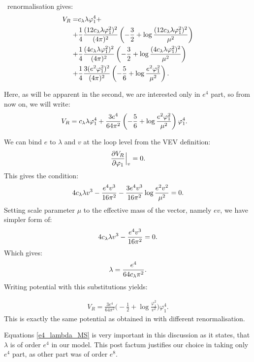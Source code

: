 \MSbar\ renormalisation gives:
\begin{align}
V_{R}=&c_\lambda\lambda\varphi_1^4 + \notag \\
+&\frac{1}{4}\frac{(12c_\lambda\lambda\varphi_1^2)^2}{(4\pi)^2}\left(-\frac{3}{2}+ 
\log{\frac{(12c_\lambda\lambda\varphi_1^2)^2}{\mu^2}}\right)\notag  \\
+&\frac{1}{4}\frac{(4c_\lambda\lambda\varphi_1^2)^2}{(4\pi)^2}\left(-\frac{3}{2}+ 
\log{\frac{(4c_\lambda\lambda\varphi_1^2)^2}{\mu^2}}\right) \notag \\
+&\frac{1}{4}\frac{3(e^2\varphi_1^2)^2}{(4\pi)^2}\left(-\frac{5}{6}+
\log{\frac{e^2\varphi_1^2}{\mu^2}}\right).
\end{align}

Here, as will be apparent in the second, we are interested only in $e^4$ part, so from now on, 
we will write:
\begin{align}
V_{R}=c_\lambda\lambda\varphi_1^4 + \frac{3e^4}{64\pi^2}&\left(-\frac{5}{6}+
\log{\frac{e^2\varphi_1^2}{\mu^2}}\right)\varphi_1^4.
\end{align}

We can bind $e$ to $\lambda$ and $v$ at the loop level from the VEV definition:
\begin{align}
\frac{\partial V_R}{\partial \varphi_1} \Big|_v= 0.
\end{align}
This gives the condition:
\begin{align}
4c_\lambda\lambda v^3-\frac{e^4v^3}{16\pi^2}-\frac{3e^4v^3}{16\pi^2}\log\frac{e^2v^2}{\mu^2}=0.
\end{align}
Setting scale parameter $\mu$ to the effective mass of the vector, namely $ev$, we have 
simpler form of:
\begin{align}
4c_\lambda\lambda v^3-\frac{e^4v^3}{16\pi^2}=0.
\end{align}
Which gives:
\begin{align}\label{e4_lambda_MS}
\lambda = \frac{e^4}{64c_\lambda\pi^2}.
\end{align}
Writing potential with this substitutions yields:

\begin{align}\label{MSbar_result}
V_R = \frac{3e^4}{64\pi^2}\Big(-\frac{1}{2}+\log\frac{\varphi_1^2}{v^2}\Big)\varphi_1^4.
\end{align}
This is exactly the same potential as obtained in \cite{Coleman1973} with different renormalisation.

Equations \ref{e4_lambda_MS} is very important in this discussion as it states, that $\lambda$ 
is of order $e^4$ in our model. This post factum justifies our 
choice in taking only $e^4$ part, as other part was of order $e^8$. \\

